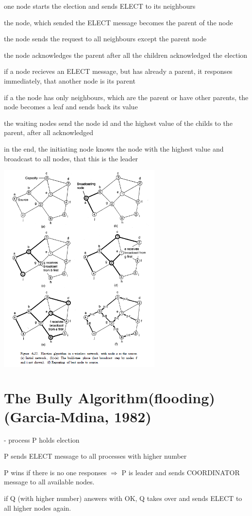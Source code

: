 \begin{compactenum}
\item one node starts the election and sends ELECT to its neighbours
\item the node, which sended the ELECT message becomes the parent of the node
\item the node sends the request to all neighbours except the parent node
\item the node acknowledges the parent after all the children acknowledged the election
\item if a node recieves an ELECT message, but has already a parent, it responses immediately, that another node is its parent
\item if a the node has only neighbours, which are the parent or have other parents, the node becomes a leaf and sends back its value
\item the waiting nodes send the node id and the highest value of the childs to the parent, after all acknowledged
\item in the end, the initiating node knows the node with the highest value and broadcast to all nodes, that this is the leader
\end{compactenum}
\begin{minipage}{\linewidth}
	\centering\includegraphics[width=310px]{gfx/Leader_adhoc.png}
	\label{img:Leader_adhoc}
\end{minipage}

\section{The Bully Algorithm(flooding) (Garcia-Mdina, 1982)}
- process P holds election
\begin{compactenum}
\item P sends ELECT message to all processes with higher number
\item P wins if there is no one responses $\Rightarrow$ P is leader and sends COORDINATOR message to all available nodes.
\item if Q (with higher number) answers with OK, Q takes over and sends ELECT to all higher nodes again.
\end{compactenum}

